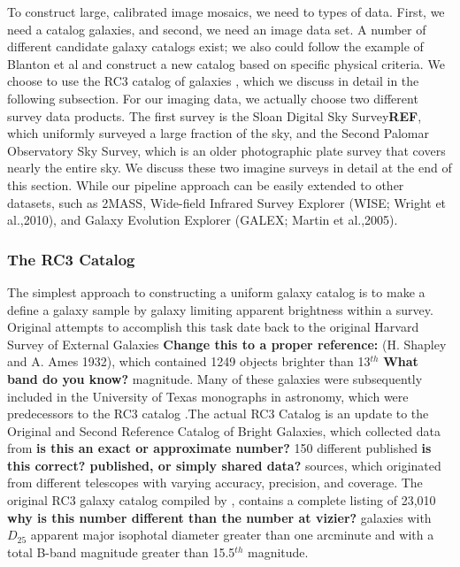 \documentclass[authoryear, 12pt,5p, times]{elsarticle}
\begin{document}
To construct large, calibrated image mosaics, we need to types of data. First, we need a catalog galaxies, and second, we need an image data set. A number of different candidate galaxy catalogs exist; we also could follow the example of Blanton et al and construct a new catalog based on specific physical criteria. We choose to use the RC3 catalog of galaxies \citet{rc3}, which we discuss in detail in the following subsection. For our imaging data, we actually choose two different survey data products. The first survey is the Sloan Digital Sky Survey\textbf{REF}, which uniformly surveyed a large fraction of the sky, and the Second Palomar Observatory Sky Survey, which is an older photographic plate survey that covers nearly the entire sky. We discuss these two imagine surveys in detail at the end of this section. While our pipeline approach can be easily extended to other datasets, such as 2MASS, Wide-field Infrared Survey Explorer (WISE; Wright et al.,2010), and Galaxy Evolution Explorer (GALEX; Martin et al.,2005).%

\subsubsection{The RC3 Catalog\label{sec:rc3}}

The simplest approach to constructing a uniform galaxy catalog is to make a define a galaxy sample by galaxy limiting apparent brightness within a survey. Original attempts to accomplish this task date back to the original Harvard Survey of External Galaxies \textbf{Change this to a proper reference: }(H. Shapley and A. Ames 1932), which contained 1249 objects brighter than 13$^{th}$ \textbf{What band do you know?} magnitude. Many of these galaxies were subsequently included in the University of Texas monographs in astronomy, which were predecessors to the RC3 catalog .The actual RC3 Catalog is an update to the Original and Second Reference Catalog of Bright Galaxies, which collected data from \textbf{is this an exact or approximate number?} 150 different published \textbf{is this correct? published, or simply shared data?} sources, which originated from different telescopes with varying accuracy, precision, and coverage. The original RC3 galaxy catalog compiled by \citet{rc3}, contains a  complete listing of 23,010 \textbf{why is this number different than the number at vizier?} galaxies with $D_{25}$ apparent major isophotal diameter  greater than one arcminute and with a total B-band magnitude greater than 15.5$^{th}$ magnitude. 
\end{document}
